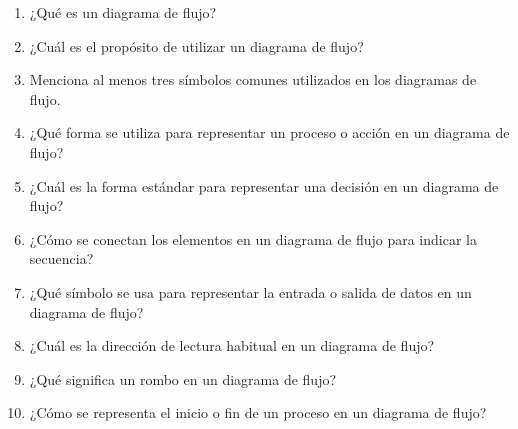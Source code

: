 \documentclass[../main]{subfiles}
\begin{document}
\begin{enumerate}
  \item ¿Qué es un diagrama de flujo?

  \item ¿Cuál es el propósito de utilizar un diagrama de flujo?

  \item Menciona al menos tres símbolos comunes utilizados en los
    diagramas de flujo.

  \item ¿Qué forma se utiliza para representar un proceso o acción en
    un diagrama de flujo?

  \item ¿Cuál es la forma estándar para representar una decisión en
    un diagrama de flujo?

  \item ¿Cómo se conectan los elementos en un diagrama de flujo para
    indicar la secuencia?

  \item ¿Qué símbolo se usa para representar la entrada o salida de
    datos en un diagrama de flujo?

  \item ¿Cuál es la dirección de lectura habitual en un diagrama de flujo?

  \item ¿Qué significa un rombo en un diagrama de flujo?

  \item ¿Cómo se representa el inicio o fin de un proceso en
    un diagrama de flujo?
\end{enumerate}
\end{document}
